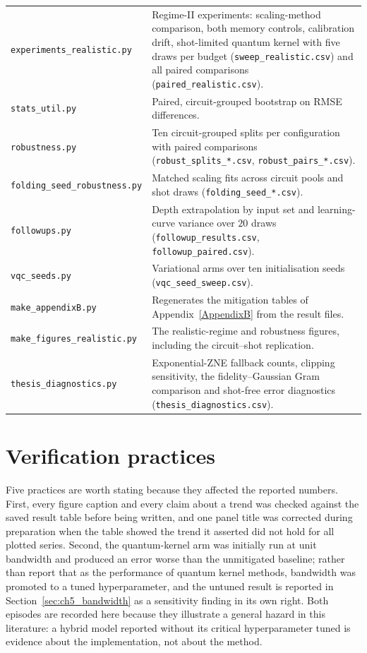 \documentclass[Thesis.tex]{subfiles}
\begin{document}
\begin{longtable}{p{4.9cm} >{\raggedright\arraybackslash}p{10.0cm}}
\addlinespace
\texttt{experiments\_\allowbreak realistic.py} &
Regime-II experiments: scaling-method comparison, both memory controls, calibration
drift, shot-limited quantum kernel with five draws per budget
(\texttt{sweep\_realistic.csv}) and all paired comparisons
(\texttt{paired\_realistic.csv}). \\
\addlinespace
\texttt{stats\_util.py} &
Paired, circuit-grouped bootstrap on RMSE differences. \\
\texttt{robustness.py} &
Ten circuit-grouped splits per configuration with paired comparisons
(\texttt{robust\_splits\_*.csv}, \texttt{robust\_pairs\_*.csv}). \\
\texttt{folding\_seed\_\allowbreak robustness.py} &
Matched scaling fits across circuit pools and shot draws
(\texttt{folding\_seed\_*.csv}). \\

\texttt{followups.py} &
Depth extrapolation by input set and learning-curve variance over $20$ draws
(\texttt{followup\_results.csv}, \texttt{followup\_paired.csv}). \\
\texttt{vqc\_seeds.py} &
Variational arms over ten initialisation seeds (\texttt{vqc\_seed\_sweep.csv}). \\
\texttt{make\_appendixB.py} &
Regenerates the mitigation tables of
Appendix~\ref{AppendixB} from the result files. \\
\texttt{make\_figures\_\allowbreak realistic.py} &
The realistic-regime and robustness figures, including the circuit--shot
replication. \\
\texttt{thesis\_\allowbreak diagnostics.py} &
Exponential-ZNE fallback counts, clipping sensitivity, the fidelity--Gaussian Gram
comparison and shot-free error diagnostics (\texttt{thesis\_diagnostics.csv}). \\
\end{longtable}

\section{Verification practices}\label{sec:ch4_verification}

Five practices are worth stating because they affected the reported numbers. First,
every figure caption and every claim about a trend was checked against the saved
result table before being written, and one panel title was corrected during
preparation when the table showed the trend it asserted did not hold for all
plotted series. Second, the quantum-kernel arm was initially run at unit bandwidth
and produced an error worse than the unmitigated baseline; rather than report that
as the performance of quantum kernel methods, bandwidth was promoted to a tuned
hyperparameter, and the untuned result is reported in
Section~\ref{sec:ch5_bandwidth} as a sensitivity finding in its own right. Both
episodes are recorded here because they illustrate a general hazard in this
literature: a hybrid model reported without its critical hyperparameter tuned is
evidence about the implementation, not about the method.
\end{document}
